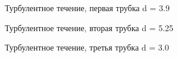 \documentclass[a4paper,12pt]{article}
\begin{document}
    \begin{figure}[h!]
    \caption[]{ Турбулентное течение, первая трубка d = 3.9 }
    \end{figure}

    \begin{figure}[h!]
    \caption[]{ Турбулентное течение, вторая трубка d = 5.25 }
    \end{figure}

    \begin{figure}[h!]
    \caption[]{ Турбулентное течение, третья трубка d = 3.0 }
    \end{figure}
\end{document}
